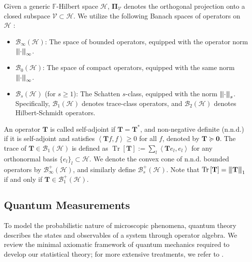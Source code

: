 \documentclass[noinfoline]{imsart}\setcounter{tocdepth}{2}
\renewcommand{\b}[1]{\mathbb{#1}} %
\newcommand{\m}[1]{\mathbf{#1}} %
\renewcommand{\c}[1]{\mathcal{#1}} %
\newcommand{\tr}[1]{\operatorname{Tr}\left[#1\right]}
\newcommand{\vertiii}[1]{{\left\vert\kern-0.25ex\left\vert\kern-0.25ex\left\vert #1 
    \right\vert\kern-0.25ex\right\vert\kern-0.25ex\right\vert}} %
\newcommand{\innpr}[2]{{\left\langle {#1},{#2}\right\rangle}} %
\theoremstyle{plain}
\begin{document}
Given a generic $\b{F}$-Hilbert space $\c{H}$, $\m{\Pi}_{\c{V}}$ denotes the orthogonal projection onto a closed subspace $\c{V} \subset \c{H}$. We utilize the following Banach spaces of operators on $\c{H}$ \cite{conway2019functional}:
\begin{itemize}
    \item $\c{B}_{\infty}(\c{H})$: The space of bounded operators, equipped with the operator norm $\vertiii{\cdot}_{\infty}$.
    \item $\c{B}_{0}(\c{H})$: The space of compact operators, equipped with the same norm $\vertiii{\cdot}_{\infty}$.
    \item $\c{B}_{s}(\c{H})$ (for $s \ge 1$): The Schatten $s$-class, equipped with the norm $\vertiii{\cdot}_{s}$. Specifically, $\c{B}_{1}(\c{H})$ denotes trace-class operators, and $\c{B}_{2}(\c{H})$ denotes Hilbert-Schmidt operators.
\end{itemize}
An operator $\m{T}$ is called self-adjoint if $\m{T} = \m{T}^{*}$, and non-negative definite (n.n.d.) if it is self-adjoint and satisfies $\innpr{\m{T} f}{f} \ge 0$ for all $f$, denoted by $\m{T} \succeq \m{0}$. The trace of $\m{T} \in \c{B}_{1}(\c{H})$ is defined as $\tr{\m{T}} := \sum_{l} \innpr{\m{T} e_{l}}{e_{l}}$ for any orthonormal basis $\{e_{l}\}_{l} \subset \c{H}$. We denote the convex cone of n.n.d. bounded operators by $\c{B}_{\infty}^{+}(\c{H})$, and similarly define $\c{B}_{s}^{+}(\c{H})$. Note that $\tr{\m{T}} = \vertiii{\m{T}}_{1}$ if and only if $\m{T} \in \c{B}_{1}^{+}(\c{H})$.

\subsection{Quantum Measurements}\label{ssec:quant:msr}
To model the probabilistic nature of microscopic phenomena, quantum theory describes the states and observables of a system through operator algebra. We review the minimal axiomatic framework of quantum mechanics required to develop our statistical theory; for more extensive treatments, we refer to \cite{holevo2011probabilistic,hall2013quantum,talagrand2022quantum, cohen2019quantum,nielsen2010quantum}.
\end{document}
